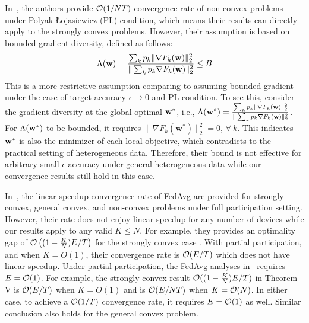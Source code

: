 In~\cite{haddadpour2019convergence}, the authors provide ${\mathcal{O}}(1/NT)$ convergence rate of non-convex problems under Polyak-Łojasiewicz (PL) condition, which
means their results can directly apply to the strongly convex problems. However, their assumption is based on bounded gradient diversity, defined as follows: 
\begin{align*}
	\Lambda({\mathbf{w}}) = \frac{\sum_{k}p_{k}\|\nabla F_{k}(\mathbf{w})\|_{2}^{2}}{\|\sum_{k}p_{k}\nabla F_{k}(\mathbf{w})\|_{2}^{2}} \leq B
\end{align*} 
This is a more restrictive assumption comparing to assuming bounded gradient under the case of target accuracy $\epsilon \rightarrow 0$ and PL condition.
To see this, consider the gradient diversity at the global optimal ${\mathbf{w}}^*$, i.e., $\Lambda({\mathbf{w}}^*) = \frac{\sum_{k}p_{k}\|\nabla F_{k}(\mathbf{w})\|_{2}^{2}}{\|\sum_{k}p_{k}\nabla F_{k}(\mathbf{w})\|_{2}^{2}}$. For $\Lambda({\mathbf{w}}^*)$ to be bounded, it requires $\|\nabla F_{k}(\mathbf{w}^*)\|_{2}^{2} = 0$, $\forall \ k$. This indicates 
${\mathbf{w}}^*$ is also the minimizer of each local objective, which contradicts to the practical setting of heterogeneous data. Therefore, their bound 
is not effective for arbitrary small $\epsilon$-accuracy under general heterogeneous data while our convergence results still hold in this case.

In~\cite{karimireddy2019scaffold}, the linear speedup convergence rate of FedAvg are provided for strongly convex, general convex, and non-convex problems 
under full participation setting. However, their rate does not enjoy linear speedup for any number of devices while our results apply to any valid $K\leq N$. For example,  they provides an optimality gap of ${\mathcal{O}}\left((1-\frac{K}{N})E/T\right)$ for the strongly convex case \cite[Theorem V]{karimireddy2019scaffold}.
With partial participation, and when $K=O(1)$, their convergence rate is ${\mathcal{O}}(E/T)$ which does not have linear speedup. 
Under partial participation, the FedAvg analyses in~\cite{karimireddy2019scaffold} requires $E={\mathcal{O}}(1)$. For example, the strongly convex result ${\mathcal{O}}((1-\frac{K}{N})E/T)$ in Theorem V is ${\mathcal{O}}(E/T)$ when $K=O(1)$ and is ${\mathcal{O}}(E/NT)$ when $K={\mathcal{O}}(N)$. In either case, to achieve a ${\mathcal{O}}(1/T)$ convergence rate, it requires $E={\mathcal{O}}(1)$ as well. Similar conclusion also holds for the general convex problem. 

